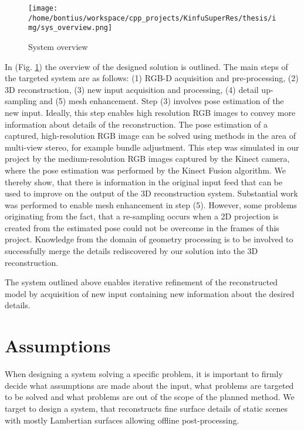 \documentclass{ucl_thesis}
\newcommand{\figref}[1]{(Fig. \ref{#1})}
\begin{document}
\begin{figure}[h!]\centering
    \texttt{[image: /home/bontius/workspace/cpp\_projects/KinfuSuperRes/thesis/img/sys\_overview.png]}
    \caption{System overview}
    \label{fig:sys_overview}
\end{figure}

\par In \figref{fig:sys_overview} the overview of the designed solution is outlined. The main steps of the targeted system are as follows: (1) RGB-D acquisition and pre-processing, (2) 3D reconstruction, (3) new input acquisition and processing, (4) detail up-sampling and (5) mesh enhancement. Step (3) involves pose estimation of the new input. Ideally, this step enables high resolution RGB images to convey more information about details of the reconstruction. The pose estimation of a captured, high-resolution RGB image can be solved using methods in the area of multi-view stereo, for example bundle adjustment. This step was simulated in our project by the medium-resolution RGB images captured by the Kinect camera, where the pose estimation was performed by the Kinect Fusion algorithm. We thereby show, that there is information in the original input feed that can be used to improve on the output of the 3D reconstruction system. Substantial work was performed to enable mesh enhancement in step (5). However, some problems originating from the fact, that a re-sampling occurs when a 2D projection is created from the estimated pose could not be overcome in the frames of this project. Knowledge from the domain of geometry processing is to be involved to successfully merge the details rediscovered by our solution into the 3D reconstruction.

\par The system outlined above enables iterative refinement of the reconstructed model by acquisition of new input containing new information about the desired details.

\section{Assumptions}
\label{sec:assumptions}

\par When designing a system solving a specific problem, it is important to firmly decide what assumptions are made about the input, what problems are targeted to be solved and what problems are out of the scope of the planned method. We target to design a system, that reconstructs fine surface details of static scenes with mostly Lambertian surfaces allowing offline post-processing. \\
\end{document}
